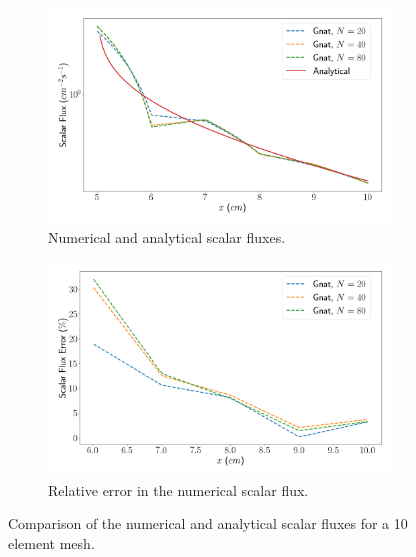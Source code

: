 \begin{figure}[H]
    \centering
    \begin{subfigure}[b]{0.495\textwidth}
        \centering
        \includegraphics[width=\textwidth]{images/verification/1d_slab/1D_analytical_flux_1.png}
        \caption{Numerical and analytical scalar fluxes.}
        \label{fig:verification:1D_flux:10_elem}
    \end{subfigure}
    \hfill
    \begin{subfigure}[b]{0.495\textwidth}
        \centering
        \includegraphics[width=\textwidth]{images/verification/1d_slab/1D_analytical_flux_error_1.png}
        \caption{Relative error in the numerical scalar flux.}
        \label{fig:verification:1D_flux:10_elem_error}
    \end{subfigure}
    \caption{Comparison of the numerical and analytical scalar fluxes for a 10 element mesh.}
    \label{fig:verification:1D_flux_10_elem}
\end{figure}
